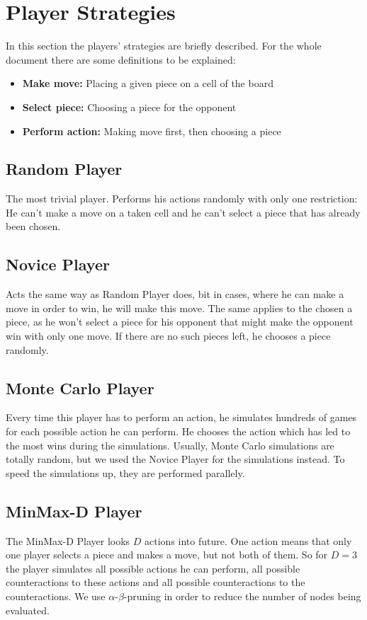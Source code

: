 \chapter{Player Strategies}
In this section the players' strategies are briefly described. For the whole document there are some definitions to be explained:
\begin{itemize}
	\item \textbf{Make move:} Placing a given piece on a cell of the board
	\item \textbf{Select piece:} Choosing a piece for the opponent
	\item \textbf{Perform action:} Making move first, then choosing a piece
\end{itemize}
\section{Random Player}
The most trivial player. Performs his actions randomly with only one restriction: He can't make a move on a taken cell and he can't select a piece that has already been chosen.
\section{Novice Player}
Acts the same way as Random Player does, bit in cases, where he can make a move in order to win, he will make this move. The same applies to the chosen a piece, as he won't select a piece for his opponent that might make the opponent win with only one move. If there are no such pieces left, he chooses a piece randomly.
\section{Monte Carlo Player}
Every time this player has to perform an action, he simulates hundreds of games for each possible action he can perform. He chooses the action which has led to the most wins during the simulations. Usually, Monte Carlo simulations are totally random, but we used the Novice Player for the simulations instead. To speed the simulations up, they are performed parallely.
\section{MinMax-D Player}
The MinMax-D Player looks $D$ actions into future. One action means that only one player selects a piece and makes a move, but not both of them. So for $D=3$ the player simulates all possible actions he can perform, all possible counteractions to these actions and all possible counteractions to the counteractions. We use $\alpha$-$\beta$-pruning in order to reduce the number of nodes being evaluated.


